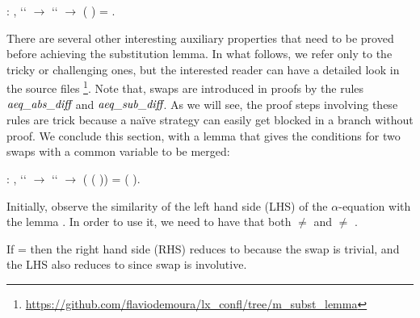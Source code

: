 \begin{coqdoccode}
\coqdocemptyline
\coqdocnoindent
{} : \coqdockw{\ensuremath{\forall}}   ,  ``   \ensuremath{\rightarrow}  ``   \ensuremath{\rightarrow} (   ) =  .\coqdoceol
 \coqdocemptyline
\coqdocemptyline
\end{coqdoccode}
There are several other interesting auxiliary properties that need to be proved before achieving the substitution lemma. In what follows, we refer only to the tricky or challenging ones, but the interested reader can have a detailed look in the source files \footnote{\url{https://github.com/flaviodemoura/lx_confl/tree/m_subst_lemma}}. Note that, swaps are introduced in proofs by the rules $\mbox{\it aeq}\_\mbox{\it abs}\_\mbox{\it diff}$ and $\mbox{\it aeq}\_\mbox{\it sub}\_\mbox{\it diff}$. As we will see, the proof steps involving these rules are trick because a naïve strategy can easily get blocked in a branch without proof. We conclude this section, with a lemma that gives the conditions for two swaps with a common variable to be merged: 
\begin{coqdoccode}
\coqdocemptyline
\coqdocnoindent
{} : \coqdockw{\ensuremath{\forall}}    ,  ``   \ensuremath{\rightarrow}  ``   \ensuremath{\rightarrow} (   (   )) = (   ).\coqdoceol
\end{coqdoccode}
 Initially, observe the similarity of the left hand side (LHS) of the $\alpha$-equation with the lemma . In order to use it, we need to have that both  \ensuremath{\not=}  and  \ensuremath{\not=} . 
\begin{coqdoccode}
\end{coqdoccode}
If  =  then the right hand side (RHS) reduces to  because the swap is trivial, and the LHS also reduces to  since swap is involutive.
